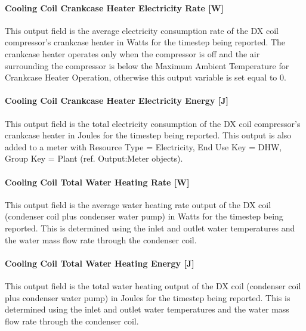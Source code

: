 \paragraph{Cooling Coil Crankcase Heater Electricity Rate {[}W{]}}\label{heating-coil-crankcase-heater-electric-powerw-1}

This output field is the average electricity consumption rate of the DX coil compressor's crankcase heater in Watts for the timestep being reported. The crankcase heater operates only when the compressor is off and the air surrounding the compressor is below the Maximum Ambient Temperature for Crankcase Heater Operation, otherwise this output variable is set equal to 0.

\paragraph{Cooling Coil Crankcase Heater Electricity Energy {[}J{]}}\label{heating-coil-crankcase-heater-electric-energy-j-2}

This output field is the total electricity consumption of the DX coil compressor's crankcase heater in Joules for the timestep being reported. This output is also added to a meter with Resource Type = Electricity, End Use Key = DHW, Group Key = Plant (ref. Output:Meter objects).

\paragraph{Cooling Coil Total Water Heating Rate {[}W{]}}\label{heating-coil-total-water-heating-rate-w}

This output field is the average water heating rate output of the DX coil (condenser coil plus condenser water pump) in Watts for the timestep being reported. This is determined using the inlet and outlet water temperatures and the water mass flow rate through the condenser coil.

\paragraph{Cooling Coil Total Water Heating Energy {[}J{]}}\label{heating-coil-total-water-heating-energy-j}

This output field is the total water heating output of the DX coil (condenser coil plus condenser water pump) in Joules for the timestep being reported. This is determined using the inlet and outlet water temperatures and the water mass flow rate through the condenser coil.


